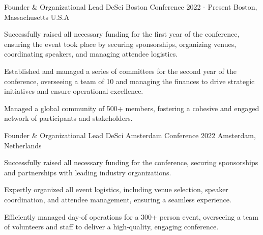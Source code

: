

\begin{cventries}

  \cventry
    {Founder \& Organizational Lead} %
    {DeSci Boston Conference} %
    {2022 - Present} %
    {Boston, Massachusetts U.S.A} %
    {
      \begin{cvitems} %
        \item {Successfully raised all necessary funding for the first year of the conference, ensuring the event took place by securing sponsorships, organizing venues, coordinating speakers, and managing attendee logistics.}
        \item {Established and managed a series of committees for the second year of the conference, overseeing a team of 10 and managing the finances to drive strategic initiatives and ensure operational excellence.}
        \item {Managed a global community of 500+ members, fostering a cohesive and engaged network of participants and stakeholders.}
      \end{cvitems}
    }


  \cventry
    {Founder \& Organizational Lead} %
    {DeSci Amsterdam Conference} %
    {2022} %
    {Amsterdam, Netherlands} %
    {
      \begin{cvitems} %
        \item {Successfully raised all necessary funding for the conference, securing sponsorships and partnerships with leading industry organizations.}
        \item {Expertly organized all event logistics, including venue selection, speaker coordination, and attendee management, ensuring a seamless experience.}
        \item {Efficiently managed day-of operations for a 300+ person event, overseeing a team of volunteers and staff to deliver a high-quality, engaging conference.}
      \end{cvitems}
    }


\end{cventries}
